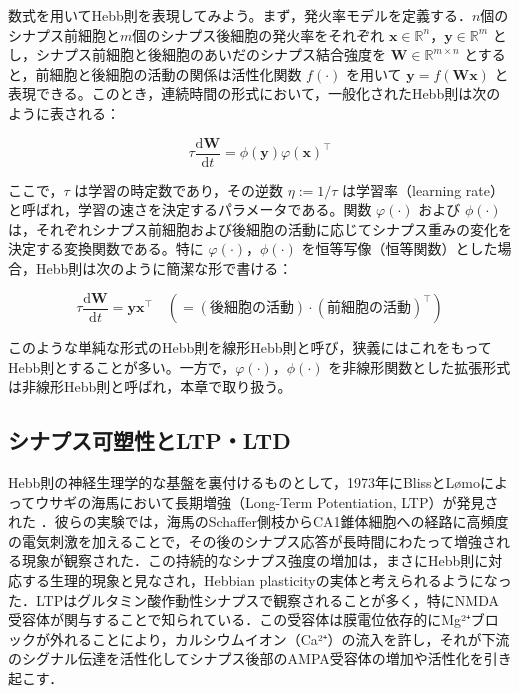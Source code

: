 \documentclass[titlepage]{ltjsbook}
\begin{document}
数式を用いてHebb則を表現してみよう。まず，発火率モデルを定義する．$n$個のシナプス前細胞と$m$個のシナプス後細胞の発火率をそれぞれ $\mathbf{x} \in \mathbb{R}^n$，$\mathbf{y} \in \mathbb{R}^m$ とし，シナプス前細胞と後細胞のあいだのシナプス結合強度を $\mathbf{W} \in \mathbb{R}^{m \times n}$ とすると，前細胞と後細胞の活動の関係は活性化関数 $f(\cdot)$ を用いて $\mathbf{y} = f(\mathbf{W}\mathbf{x})$ と表現できる。このとき，連続時間の形式において，一般化されたHebb則は次のように表される：

\begin{equation}
\tau \frac{\mathrm{d}\mathbf{W}}{\mathrm{d}t} = \phi(\mathbf{y}) \varphi(\mathbf{x})^\top
\end{equation}

ここで，$\tau$ は学習の時定数であり，その逆数 $\eta := 1/\tau$ は学習率（learning rate）と呼ばれ，学習の速さを決定するパラメータである。関数 $\varphi(\cdot)$ および $\phi(\cdot)$ は，それぞれシナプス前細胞および後細胞の活動に応じてシナプス重みの変化を決定する変換関数である。特に $\varphi(\cdot)$，$\phi(\cdot)$ を恒等写像（恒等関数）とした場合，Hebb則は次のように簡潔な形で書ける：

\begin{equation}
\tau \dfrac{\mathrm{d}\mathbf{W}}{\mathrm{d}t} = \mathbf{y} \mathbf{x}^\top\quad \left(= (\textrm{後細胞の活動}) \cdot (\textrm{前細胞の活動})^\top\right)
\end{equation}

このような単純な形式のHebb則を線形Hebb則と呼び，狭義にはこれをもってHebb則とすることが多い。一方で，$\varphi(\cdot)$，$\phi(\cdot)$ を非線形関数とした拡張形式は非線形Hebb則と呼ばれ，本章で取り扱う。

\subsection{シナプス可塑性とLTP・LTD}
Hebb則の神経生理学的な基盤を裏付けるものとして，1973年にBlissとLømoによってウサギの海馬において長期増強（Long-Term Potentiation, LTP）が発見された \citep{Bliss1973-vj}．彼らの実験では，海馬のSchaffer側枝からCA1錐体細胞への経路に高頻度の電気刺激を加えることで，その後のシナプス応答が長時間にわたって増強される現象が観察された．この持続的なシナプス強度の増加は，まさにHebb則に対応する生理的現象と見なされ，Hebbian plasticityの実体と考えられるようになった．LTPはグルタミン酸作動性シナプスで観察されることが多く，特にNMDA受容体が関与することで知られている．この受容体は膜電位依存的にMg²⁺ブロックが外れることにより，カルシウムイオン（Ca²⁺）の流入を許し，それが下流のシグナル伝達を活性化してシナプス後部のAMPA受容体の増加や活性化を引き起こす．
\end{document}
